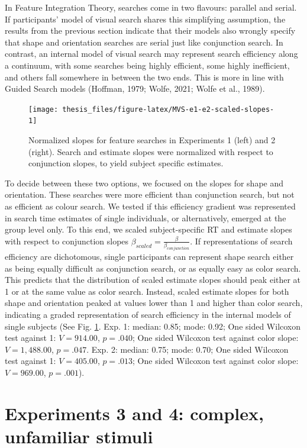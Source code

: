\documentclass[12pt,twoside]{reedthesis}
\begin{document}
In Feature Integration Theory, searches come in two flavours: parallel and serial. If participants' model of visual search shares this simplifying assumption, the results from the previous section indicate that their models also wrongly specify that shape and orientation searches are serial just like conjunction search. In contrast, an internal model of visual search may represent search efficiency along a continuum, with some searches being highly efficient, some highly inefficient, and others fall somewhere in between the two ends. This is more in line with Guided Search models (Hoffman, 1979; Wolfe, 2021; Wolfe et al., 1989).
\begin{figure}
\texttt{[image: thesis\_files/figure-latex/MVS-e1-e2-scaled-slopes-1]} \caption[Normalized slopes, Experiments 1 and 2]{Normalized slopes for feature searches in Experiments 1 (left) and 2 (right). Search and estimate slopes were normalized with respect to conjunction slopes, to yield subject specific estimates.}\label{fig:MVS-e1-e2-scaled-slopes}
\end{figure}
To decide between these two options, we focused on the slopes for shape and orientation. These searches were more efficient than conjunction search, but not as efficient as colour search. We tested if this efficiency gradient was represented in search time estimates of single individuals, or alternatively, emerged at the group level only. To this end, we scaled subject-specific RT and estimate slopes with respect to conjunction slopes \(\beta_{scaled}=\frac{\beta}{\beta_{conjunction}}\). If representations of search efficiency are dichotomous, single participants can represent shape search either as being equally difficult as conjunction search, or as equally easy as color search. This predicts that the distribution of scaled estimate slopes should peak either at 1 or at the same value as color search. Instead, scaled estimate slopes for both shape and orientation peaked at values lower than 1 and higher than color search, indicating a graded representation of search efficiency in the internal models of single subjects (See Fig. \ref{fig:MVS-e1-e2-scaled-slopes}. Exp. 1: median: 0.85; mode: 0.92; One sided Wilcoxon test against 1: \(V = 914.00\), \(p = .040\); One sided Wilcoxon test against color slope: \(V = 1,488.00\), \(p = .047\). Exp. 2: median: 0.75; mode: 0.70; One sided Wilcoxon test against 1: \(V = 405.00\), \(p = .013\); One sided Wilcoxon test against color slope: \(V = 969.00\), \(p = .001\)).

\hypertarget{experiments-3-and-4-complex-unfamiliar-stimuli}{%
\section{Experiments 3 and 4: complex, unfamiliar stimuli}\label{experiments-3-and-4-complex-unfamiliar-stimuli}}
\end{document}

